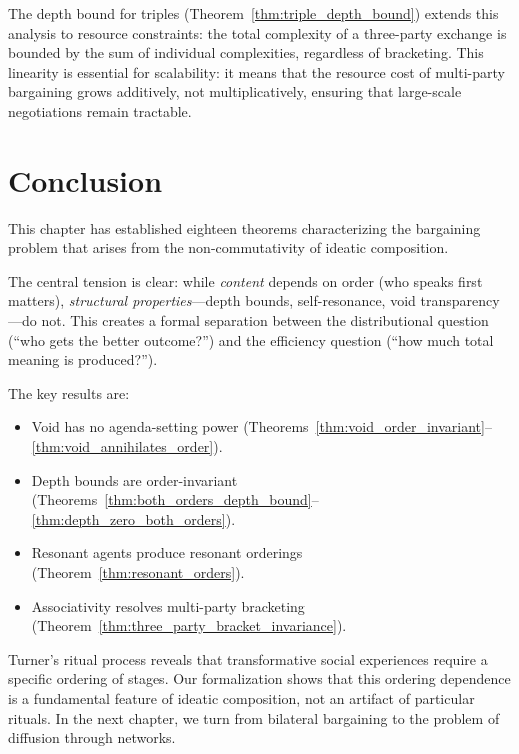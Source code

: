 The depth bound for triples (Theorem~\ref{thm:triple_depth_bound})
extends this analysis to resource constraints: the total complexity of a
three-party exchange is bounded by the sum of individual complexities,
regardless of bracketing.  This linearity is essential for scalability:
it means that the resource cost of multi-party bargaining grows
additively, not multiplicatively, ensuring that large-scale negotiations
remain tractable.

\section{Conclusion}
\label{sec:ch17-concl}

This chapter has established eighteen theorems characterizing the
bargaining problem that arises from the non-commutativity of ideatic
composition.

The central tension is clear: while \emph{content} depends on order
(who speaks first matters), \emph{structural properties}---depth bounds,
self-resonance, void transparency---do not.  This creates a formal
separation between the distributional question (``who gets the better
outcome?'') and the efficiency question (``how much total meaning is
produced?'').

The key results are:
\begin{itemize}
  \item Void has no agenda-setting power
    (Theorems~\ref{thm:void_order_invariant}--\ref{thm:void_annihilates_order}).
  \item Depth bounds are order-invariant
    (Theorems~\ref{thm:both_orders_depth_bound}--\ref{thm:depth_zero_both_orders}).
  \item Resonant agents produce resonant orderings
    (Theorem~\ref{thm:resonant_orders}).
  \item Associativity resolves multi-party bracketing
    (Theorem~\ref{thm:three_party_bracket_invariance}).
\end{itemize}

Turner's ritual process reveals that transformative social experiences
require a specific ordering of stages.  Our formalization shows that this
ordering dependence is a fundamental feature of ideatic composition, not
an artifact of particular rituals.  In the next chapter, we turn from
bilateral bargaining to the problem of diffusion through networks.
